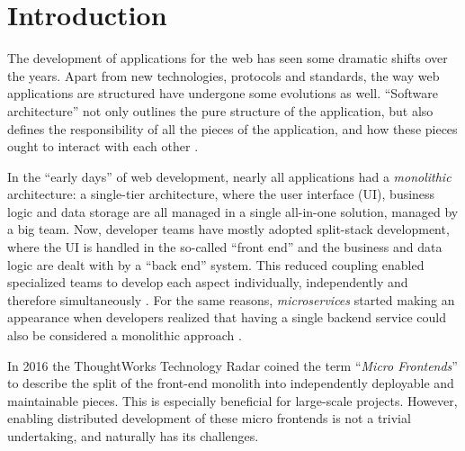 
\section{Introduction}
\label{sec:introduction}


The development of applications for the web has seen some dramatic shifts over
the years. Apart from new technologies, protocols and standards, the way web
applications are structured have undergone some evolutions as well. ``Software
architecture'' not only outlines the pure structure of the application, but also
defines the responsibility of all the pieces of the application, and how these
pieces ought to interact with each other \autocite{Fedorov_etal_1998}.

In the ``early days'' of web development, nearly all applications had a
\textit{monolithic} architecture: a single-tier architecture, where the user
interface (UI), business logic and data storage are all managed in a single
all-in-one solution, managed by a big team. Now, developer teams have mostly
adopted split-stack development, where the UI is handled in the so-called
``front end'' and the business and data logic are dealt with by a ``back end''
system. This reduced coupling enabled specialized teams to develop
each aspect individually, independently and therefore simultaneously
\autocite{Dunkley_2016}. For the same reasons, \textit{microservices} started
making an appearance when developers realized that having a single backend
service could also be considered a monolithic approach
\autocite{Fowler_Microservices_2014}.

In 2016 the ThoughtWorks Technology Radar \autocite{ThoughtWorks_2020} coined
the term ``\textit{Micro Frontends}'' to describe the split of the front-end
monolith into independently deployable and maintainable pieces. This is
especially beneficial for large-scale projects. However, enabling distributed
development of these micro frontends is not a trivial undertaking, and naturally
has its challenges.

